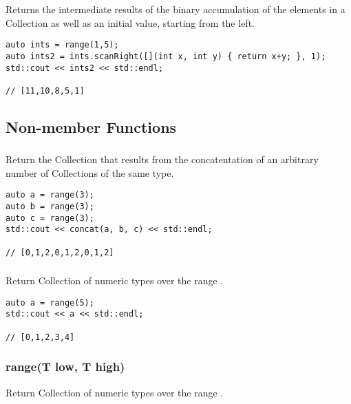 Returns the intermediate results of the binary accumulation of the elements in a Collection as well as an initial value, starting from the left.

\begin{lstlisting}[title=example]
auto ints = range(1,5);
auto ints2 = ints.scanRight([](int x, int y) { return x+y; }, 1);
std::cout << ints2 << std::endl;

// [11,10,8,5,1]
\end{lstlisting}




\subsection{Non-member Functions}

\subsubsection{}

Return the Collection that results from the concatentation of an arbitrary number of Collections of the same type.

\begin{lstlisting}[title=example]
auto a = range(3);
auto b = range(3);
auto c = range(3);
std::cout << concat(a, b, c) << std::endl;

// [0,1,2,0,1,2,0,1,2]
\end{lstlisting}





\subsubsection{}

Return Collection of numeric types over the range \code{[0, size)}.

\begin{lstlisting}[title=example]
auto a = range(5);
std::cout << a << std::endl;

// [0,1,2,3,4]
\end{lstlisting}




\subsubsection{range(T low, T high)}

Return Collection of numeric types over the range \code{[low, high)}.

